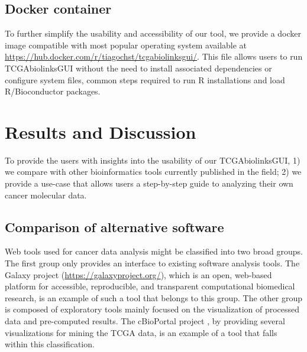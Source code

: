 \subsection{Docker container}
To further simplify the usability and accessibility of our tool, we provide a docker image compatible with most popular operating system available at \\
\href{https://hub.docker.com/r/tiagochst/tcgabiolinksgui/}{https://hub.docker.com/r/tiagochst/tcgabiolinksgui/}. This file allows users to run TCGAbiolinksGUI without the need to install associated dependencies or configure system files, common steps required to run R installations and load R/Bioconductor packages. 



\section{Results and Discussion}
To provide the users with insights into the usability of our TCGAbiolinksGUI, 1) we compare with other bioinformatics tools currently published in the field; 2) we provide a use-case that allows users a step-by-step guide to analyzing their own cancer molecular data.

\subsection{Comparison of alternative software}

Web tools used for cancer data analysis might be classified into two broad groups. 
The first group only provides an interface to existing software analysis tools.
The Galaxy project (\href{https://galaxyproject.org/}{https://galaxyproject.org/}), which is an open, web-based platform for accessible, reproducible, and transparent computational biomedical research, is an example of such a tool that belongs to this group.
The other group is composed of exploratory tools mainly focused on the visualization of processed data and pre-computed results. The cBioPortal project \cite{gao2013integrative,cerami2012cbio}, by providing several visualizations for mining the TCGA data, is an example of a tool that falls within this classification.

